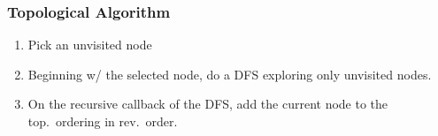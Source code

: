 \subsubsection*{Topological Algorithm}
\begin{enumerate}
    \item Pick an unvisited node
    \item Beginning w/ the selected node, do a DFS exploring only unvisited nodes.
    \item On the recursive callback of the DFS, add the current node to the top.\ ordering in rev.\ order.
\end{enumerate}

